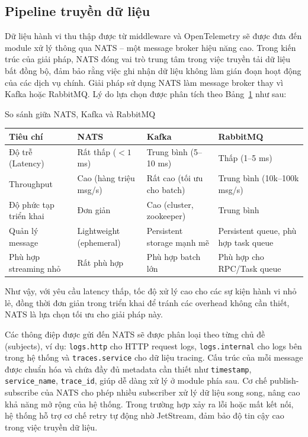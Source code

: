 \documentclass{uetgraduation}
\begin{document}
\subsection{Pipeline truyền dữ liệu}

Dữ liệu hành vi thu thập được từ middleware và OpenTelemetry sẽ được đưa đến module xử lý thông qua NATS – một message broker hiệu năng cao. Trong kiến trúc của giải pháp, NATS đóng vai trò trung tâm trong việc truyền tải dữ liệu bất đồng bộ, đảm bảo rằng việc ghi nhận dữ liệu không làm gián đoạn hoạt động của các dịch vụ chính. Giải pháp sử dụng NATS làm message broker thay vì Kafka hoặc RabbitMQ. Lý do lựa chọn được phân tích theo Bảng~\ref{tab:ssnats} như sau:

\begin{table}[H]{So sánh giữa NATS, Kafka và RabbitMQ}
\centering
\begin{tabular}{|p{3cm}|p{3cm}|p{3cm}|p{3cm}|}
\hline
\textbf{Tiêu chí} & \textbf{NATS} & \textbf{Kafka} & \textbf{RabbitMQ} \\
\hline
Độ trễ (Latency) & Rất thấp ($<1$ ms) & Trung bình (5–10 ms) & Thấp (1–5 ms) \\
\hline
Throughput & Cao (hàng triệu msg/s) & Rất cao (tối ưu cho batch) & Trung bình (10k–100k msg/s) \\
\hline
Độ phức tạp triển khai & Đơn giản & Cao (cluster, zookeeper) & Trung bình \\
\hline
Quản lý message & Lightweight (ephemeral) & Persistent storage mạnh mẽ & Persistent queue, phù hợp task queue \\
\hline
Phù hợp streaming nhỏ & Rất phù hợp & Phù hợp batch lớn & Phù hợp cho RPC/Task queue \\
\hline
\end{tabular}
\label{tab:ssnats}
\end{table}

Như vậy, với yêu cầu latency thấp, tốc độ xử lý cao cho các sự kiện hành vi nhỏ lẻ, đồng thời đơn giản trong triển khai để tránh các overhead không cần thiết, NATS là lựa chọn tối ưu cho giải pháp này.

Các thông điệp được gửi đến NATS sẽ được phân loại theo từng chủ đề (subjects), ví dụ: \texttt{logs.http} cho HTTP request logs, \texttt{logs.internal} cho logs bên trong hệ thống và \texttt{traces.service} cho dữ liệu tracing. Cấu trúc của mỗi message được chuẩn hóa và chứa đầy đủ metadata cần thiết như \texttt{timestamp}, \texttt{service\_name}, \texttt{trace\_id}, giúp dễ dàng xử lý ở module phía sau. Cơ chế publish-subscribe của NATS cho phép nhiều subscriber xử lý dữ liệu song song, nâng cao khả năng mở rộng của hệ thống. Trong trường hợp xảy ra lỗi hoặc mất kết nối, hệ thống hỗ trợ cơ chế retry tự động nhờ JetStream, đảm bảo độ tin cậy cao trong việc truyền dữ liệu.
\end{document}
